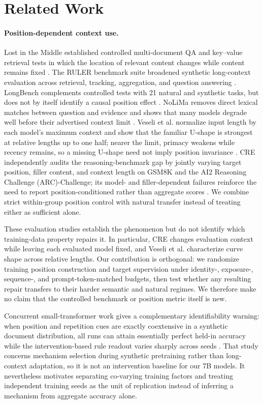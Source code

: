 \documentclass[11pt]{article}
\begin{document}
\section{Related Work}

\paragraph{Position-dependent context use.}
Lost in the Middle established controlled multi-document QA and key--value retrieval tests in which the location of relevant content changes while content remains fixed \citep{liu2024lost}. The RULER benchmark suite broadened synthetic long-context evaluation across retrieval, tracking, aggregation, and question answering \citep{hsieh2024ruler}. LongBench complements controlled tests with 21 natural and synthetic tasks, but does not by itself identify a causal position effect \citep{bai2024longbench}. NoLiMa removes direct lexical matches between question and evidence and shows that many models degrade well before their advertised context limit \citep{modarressi2025nolima}. Veseli et al. normalize input length by each model's maximum context and show that the familiar U-shape is strongest at relative lengths up to one half; nearer the limit, primacy weakens while recency remains, so a missing U-shape need not imply position invariance \citep{veseli2025shift}. CRE independently audits the reasoning-benchmark gap by jointly varying target position, filler content, and context length on GSM8K and the AI2 Reasoning Challenge (ARC)-Challenge; its model- and filler-dependent failures reinforce the need to report position-conditioned rather than aggregate scores \citep{zhang2026positional}. We combine strict within-group position control with natural transfer instead of treating either as sufficient alone.

These evaluation studies establish the phenomenon but do not identify which training-data property repairs it. In particular, CRE changes evaluation context while leaving each evaluated model fixed, and Veseli et al. characterize curve shape across relative lengths. Our contribution is orthogonal: we randomize training position construction and target supervision under identity-, exposure-, sequence-, and prompt-token-matched budgets, then test whether any resulting repair transfers to their harder semantic and natural regimes. We therefore make no claim that the controlled benchmark or position metric itself is new.

Concurrent small-transformer work gives a complementary identifiability warning: when position and repetition cues are exactly coextensive in a synthetic document distribution, all runs can attain essentially perfect held-in accuracy while the intervention-based rule readout varies sharply across seeds \citep{liao2026shortcut}. That study concerns mechanism selection during synthetic pretraining rather than long-context adaptation, so it is not an intervention baseline for our 7B models. It nevertheless motivates separating co-varying training factors and treating independent training seeds as the unit of replication instead of inferring a mechanism from aggregate accuracy alone.
\end{document}
